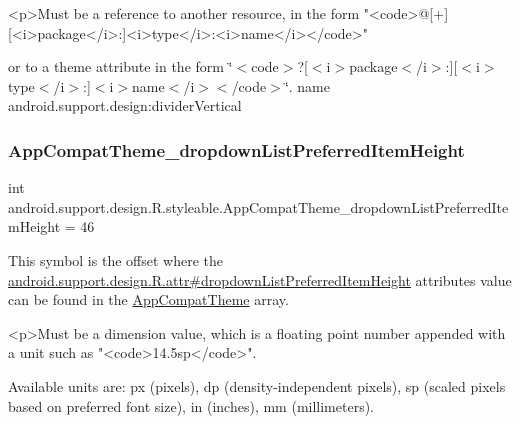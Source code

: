 \begin{DoxyVerb}      <p>Must be a reference to another resource, in the form "<code>@[+][<i>package</i>:]<i>type</i>:<i>name</i></code>"
\end{DoxyVerb}
 or to a theme attribute in the form \char`\"{}$<$code$>$?\mbox{[}$<$i$>$package$<$/i$>$\+:\mbox{]}\mbox{[}$<$i$>$type$<$/i$>$\+:\mbox{]}$<$i$>$name$<$/i$>$$<$/code$>$\char`\"{}.  name android.\+support.\+design\+:divider\+Vertical \mbox{\label{classandroid_1_1support_1_1design_1_1R_1_1styleable_a2bcc01dd4cd3ad74d4af832f4d79af52}} 
\subsubsection{\texorpdfstring{App\+Compat\+Theme\+\_\+dropdown\+List\+Preferred\+Item\+Height}{AppCompatTheme\_dropdownListPreferredItemHeight}}
{\footnotesize\ttfamily int android.\+support.\+design.\+R.\+styleable.\+App\+Compat\+Theme\+\_\+dropdown\+List\+Preferred\+Item\+Height = 46\hspace{0.3cm}{\ttfamily [static]}}

This symbol is the offset where the \hyperlink{classandroid_1_1support_1_1design_1_1R_1_1attr_ae39cdea84f2a4492abd1e1e9e4415cf1}{android.\+support.\+design.\+R.\+attr\#dropdown\+List\+Preferred\+Item\+Height} attribute\textquotesingle{}s value can be found in the \hyperlink{classandroid_1_1support_1_1design_1_1R_1_1styleable_afb351dc8de20cbd4c89abe360373010c}{App\+Compat\+Theme} array.

\begin{DoxyVerb}      <p>Must be a dimension value, which is a floating point number appended with a unit such as "<code>14.5sp</code>".
\end{DoxyVerb}
 Available units are\+: px (pixels), dp (density-\/independent pixels), sp (scaled pixels based on preferred font size), in (inches), mm (millimeters). 

